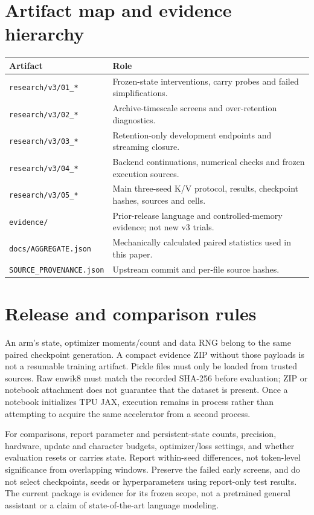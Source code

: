 \documentclass[10pt]{article}
\begin{document}
\section{Artifact map and evidence hierarchy}
\small
\begin{tabular}{p{.29\linewidth}p{.64\linewidth}}
\toprule
Artifact & Role \\
\midrule
\texttt{research/v3/01\_*} & Frozen-state interventions, carry probes and failed simplifications. \\
\texttt{research/v3/02\_*} & Archive-timescale screens and over-retention diagnostics. \\
\texttt{research/v3/03\_*} & Retention-only development endpoints and streaming closure. \\
\texttt{research/v3/04\_*} & Backend continuations, numerical checks and frozen execution sources. \\
\texttt{research/v3/05\_*} & Main three-seed K/V protocol, results, checkpoint hashes, sources and cells. \\
\texttt{evidence/} & Prior-release language and controlled-memory evidence; not new v3 trials. \\
\texttt{docs/AGGREGATE.json} & Mechanically calculated paired statistics used in this paper. \\
\texttt{SOURCE\_PROVENANCE.json} & Upstream commit and per-file source hashes. \\
\bottomrule
\end{tabular}
\normalsize

\section{Release and comparison rules}
An arm's state, optimizer moments/count and data RNG belong to the same paired
checkpoint generation. A compact evidence ZIP without those payloads is not a
resumable training artifact. Pickle files must only be loaded from trusted
sources. Raw enwik8 must match the recorded SHA-256 before evaluation; ZIP or
notebook attachment does not guarantee that the dataset is present. Once a
notebook initializes TPU JAX, execution remains in process rather than attempting
to acquire the same accelerator from a second process.

For comparisons, report parameter and persistent-state counts, precision,
hardware, update and character budgets, optimizer/loss settings, and whether
evaluation resets or carries state. Report within-seed differences, not token-level
significance from overlapping windows. Preserve the failed early screens, and do
not select checkpoints, seeds or hyperparameters using report-only test results.
The current package is evidence for its frozen scope, not a pretrained general
assistant or a claim of state-of-the-art language modeling.
\end{document}
